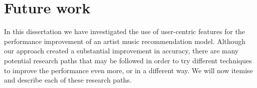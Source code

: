 











\section{Future work}
In this dissertation we have investigated the use of user-centric features for the performance improvement of an artist music recommendation model. 
Although our approach created a substantial improvement in accuracy, there are many potential research paths that may be followed in order to try different techniques to improve the performance even more, or in a different way. 
We will now itemise and describe each of these research paths.



